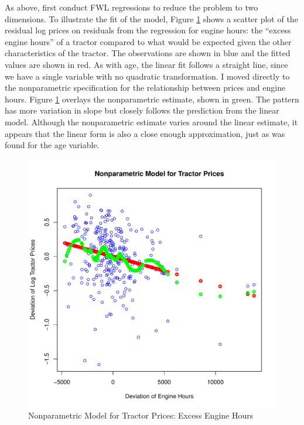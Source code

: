 \documentclass[11pt]{paper}
\begin{document}
As above, first conduct FWL regressions 
to reduce the problem to two dimensions. 
%
To illustrate the fit of the model, 
Figure \ref{fig:dev_np_vs_eng_dev}
shows a scatter plot 
of the residual log prices on 
residuals from the regression for engine hours:
the ``excess engine hours'' of a tractor compared to what would be 
expected given the other characteristics of the tractor. 
The observations are shown in blue
and the fitted values are shown in red.
As with age, the linear fit follows a straight line,
since we have a single variable with no
quadratic transformation.
% 
I moved directly to the nonparametric specification for 
the relationship between prices and engine hours.
Figure \ref{fig:dev_np_vs_eng_dev} 
overlays the nonparametric estimate, shown in green. 
The pattern has more variation in slope but 
closely follows the prediction from the linear model. 
Although the nonparametric estimate varies around the linear estimate,
it appears that the linear form
is also a close enough approximation, 
just as was found for the age variable.


\begin{figure}[h!]
  \centering
  \includegraphics[scale = 0.5, keepaspectratio=true]{../Figures/dev_np_vs_eng_dev}
  \caption{Nonparametric Model for Tractor Prices: Excess Engine Hours} \label{fig:dev_np_vs_eng_dev}
\end{figure}
\end{document}
